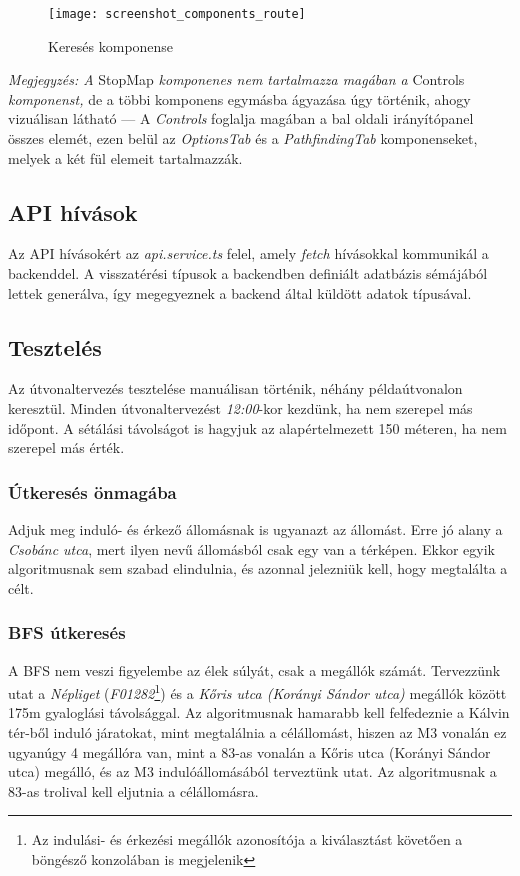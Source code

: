 \begin{figure}[H]
    \centering
    \texttt{[image: screenshot\_components\_route]}
    \caption{Keresés komponense}
    \label{fig:screenshot-components-route}
\end{figure}

\textit{Megjegyzés: A} StopMap \textit{komponenes nem tartalmazza magában a} Controls \textit{komponenst,} de a többi komponens egymásba ágyazása úgy történik, ahogy vizuálisan látható --- A \textit{Controls} foglalja magában a bal oldali irányítópanel összes elemét, ezen belül az \textit{OptionsTab} és a \textit{PathfindingTab} komponenseket, melyek a két fül elemeit tartalmazzák.

\subsection{API hívások}

Az API hívásokért az \textit{api.service.ts} felel, amely \textit{fetch} hívásokkal kommunikál a backenddel. A visszatérési típusok a backendben definiált adatbázis sémájából lettek generálva, így megegyeznek a backend által küldött adatok típusával.

\subsection{Tesztelés}

Az útvonaltervezés tesztelése manuálisan történik, néhány példaútvonalon keresztül. Minden útvonaltervezést \textit{12:00}-kor kezdünk, ha nem szerepel más időpont. A sétálási távolságot is hagyjuk az alapértelmezett 150 méteren, ha nem szerepel más érték.

\subsubsection{Útkeresés önmagába}

Adjuk meg induló- és érkező állomásnak is ugyanazt az állomást. Erre jó alany a \textit{Csobánc utca}, mert ilyen nevű állomásból csak egy van a térképen. Ekkor egyik algoritmusnak sem szabad elindulnia, és azonnal jelezniük kell, hogy megtalálta a célt.

\subsubsection{BFS útkeresés}

A BFS nem veszi figyelembe az élek súlyát, csak a megállók számát. Tervezzünk utat a \textit{Népliget} (\textit{F01282}\footnote{Az indulási- és érkezési megállók azonosítója a kiválasztást követően a böngésző konzolában is megjelenik}) és a \textit{Kőris utca (Korányi Sándor utca)} megállók között 175m gyaloglási távolsággal. Az algoritmusnak hamarabb kell felfedeznie a Kálvin tér-ből induló járatokat, mint megtalálnia a célállomást, hiszen az M3 vonalán ez ugyanúgy 4 megállóra van, mint a 83-as vonalán a Kőris utca (Korányi Sándor utca) megálló, és az M3 indulóállomásából terveztünk utat. Az algoritmusnak a 83-as trolival kell eljutnia a célállomásra.

